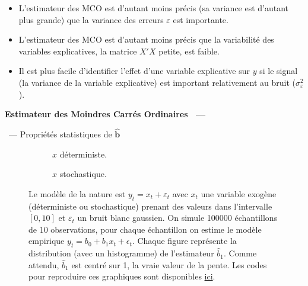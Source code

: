 \documentclass[10pt,a4paper]{article}
\makeatletter
\newcommand{\coursfile}{chapitre-1}
\newcommand{\HEAD}{HEAD}%
\newcommand{\repourl}{https://github.com/stepan-a/econometrics}
\newcommand{\coderef}[1]{\href{\repourl/blob/\HEAD/routines/\coursfile/#1}{ici}}
\theoremstyle{definition}
\renewcommand{\newline}{\unskip\par\vspace{1.5pt}}
\newenvironment{frame}[1][]{\par}{\par}
\newcommand{\frameheadrule}{%
  \par\nobreak\vspace{1pt}{\color{ctitle}\hrule height 0.6pt}\nobreak\vspace{4pt}}
\newcommand{\frametitle}[1]{%
  \par\addvspace{8pt plus 2pt}\needspace{6\baselineskip}%
  \noindent\begingroup\color{ctitle}\sffamily\bfseries\large #1\endgroup
  \@ifnextchar\framesubtitle{}{\frameheadrule}}
\newcommand{\framesubtitle}[1]{%
  \begingroup\color{ctitle}\sffamily\normalsize\ --- #1\endgroup\frameheadrule}
\makeatother
\begin{document}
\begin{notes}
  \begin{itemize}
  \item L'estimateur des MCO est d'autant moins précis (sa variance est d'autant plus grande) que la variance des erreurs $\varepsilon$ est importante.\newline

  \item L'estimateur des MCO est d'autant moins précis que la variabilité des variables explicatives, la matrice $X'X$ \guillemotleft petite\guillemotright, est faible.\newline

  \item[$\Rightarrow$] Il est plus facile d'identifier l'effet d'une variable explicative sur $y$ si le signal (la variance de la variable explicative) est important relativement au bruit ($\sigma_{\varepsilon}^2$).
  \end{itemize}

\end{notes}


\begin{frame}
  \frametitle{Estimateur des Moindres Carrés Ordinaires}
  \framesubtitle {Propriétés statistiques de $\hat{\mathbf b}$}

  \begin{figure}
    \centering
    \begin{subfigure}{0.48\textwidth}
      \scalebox{.3}{
    }
    \caption{$x$ déterministe.}
    \label{fig:slope:a}
  \end{subfigure}
  \hfill
  \begin{subfigure}{0.48\textwidth}
    \scalebox{.3}{
    }
    \caption{$x$ stochastique.}
    \label{fig:slope:b}
  \end{subfigure}
  \caption{Le modèle de la nature est $y_t = x_t + \varepsilon_t$ avec $x_t$ une variable exogène (déterministe ou stochastique) prenant des valeurs dans l'intervalle $[0,10]$ et $\varepsilon_t$ un bruit blanc gaussien. On simule 100000  échantillons de 10 observations, pour chaque échantillon on estime le modèle empirique $y_t = b_0 + b_1 x_t + \epsilon_t$. Chaque figure représente la distribution (avec un histogramme) de l'estimateur $\hat b_1$. Comme attendu,  $\hat b_1$ est centré sur 1, la vraie valeur de la pente.  Les codes pour reproduire ces graphiques sont disponibles \coderef{estimator-with-deterministic-versus-stochastic-samples.py}.}
  \label{fig:slope}
\end{figure}
\end{frame}
\end{document}
